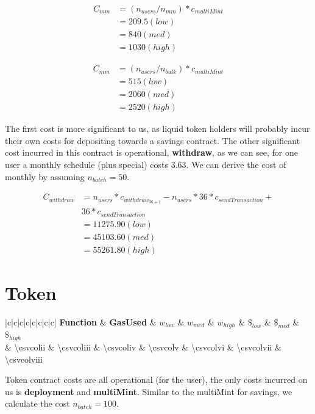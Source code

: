 \documentclass[a4paper,english]{article}
\newcommand{\rnd}[1]{
  \num[round-mode=places, round-precision=2]{#1}
}
\newcommand{\graphcosts}[1]{
\begin{tabular}{|c|c|c|c|c|c|c|c|}%
    \hline
    \textbf{Function} & \textbf{GasUsed} & \textbf{$w_{low}$} & \textbf{$w_{med}$} & \textbf{$w_{high}$} & \textbf{$\$_{low}$} & \textbf{$\$_{med}$} & \textbf{$\$_{high}$}%
    \csvreader[head to column names]{#1}{}%
    {\\\hline\csvcoli&\rnd{\csvcolii}&\rnd{\csvcoliii}&\rnd{\csvcoliv}&\rnd{\csvcolv}&\rnd{\csvcolvi}&\rnd{\csvcolvii}&\rnd{\csvcolviii}}%
    \\\hline
\end{tabular}
}
\begin{document}
\begin{equation}
\begin{aligned}
  C_{mm} &= (n_{users}/n_{mm})*c_{multiMint} \\
         &= 209.5 (low) \\
         &= 840 (med) \\
         &= 1030 (high)
\end{aligned}
\end{equation}

\begin{equation}
\begin{aligned}
  C_{mm} &= (n_{users}/n_{bulk})*c_{multiMint} \\
         &= 515 (low) \\
         &= 2060 (med) \\
         &= 2520 (high)
\end{aligned}
\end{equation}

The first cost is more significant to us, as liquid token holders will probably incur their own costs for depositing towards a savings contract. The other significant cost incurred in this contract is operational, \textbf{withdraw}, as we can see, for one user a monthly schedule (plus special) costs $3.63$. We can derive the cost of monthly by assuming $n_{batch} = 50$.

\begin{equation}
\begin{aligned}
  C_{withdraw}  &= n_{users}*c_{withdraw_{36+1}} - n_{users}*36*c_{sendTransaction} + \\
                &36*c_{sendTransaction} \\
                &= 11275.90(low) \\
                &= 45103.60(med) \\
                &= 55261.80(high)
\end{aligned}
\end{equation}

\section{Token}

\begin{adjustbox}{center, label={token_costs}, caption={Token contract costs}, float=table}
  \graphcosts{token_costs.csv}
\end{adjustbox}

Token contract costs are all operational (for the user), the only costs incurred on us is \textbf{deployment} and \textbf{multiMint}. Similar to the multiMint for savings, we calculate the cost $n_{batch}=100$.
\end{document}
